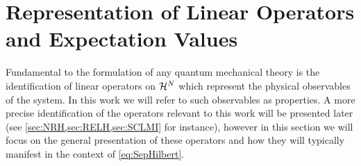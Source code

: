 \section{Representation of Linear Operators and Expectation Values}
\label{sec:LO}

Fundamental to the formulation of any quantum mechanical theory is the identification of linear operators on $\mathcal{H}^N$
which represent the physical observables of the system. In this work we will refer to such observables as properties. A
more precise identification of the operators relevant to this work will be presented later 
(see \cref{sec:NRH,sec:RELH,sec:SCLMI} for instance), however in this section we will focus on the general presentation
of these operators and how they will typically manifest in the context of \cref{eq:SepHilbert}. 

